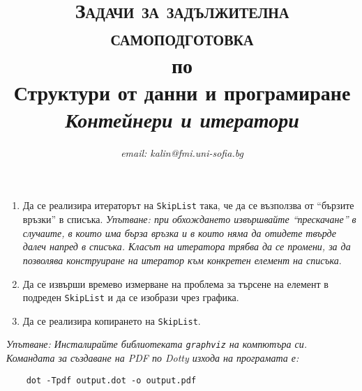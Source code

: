 \documentclass[12pt,a4paper]{article}
\author{\textit{email: kalin@fmi.uni-sofia.bg}}
\title{\textsc{Задачи за задължителна самоподготовка} \\
по \\
Структури от данни и програмиране\\
\textit{Контейнери и итератори}}
\newcommand{\code}[1]{\texttt{#1}}
\begin{document}
\maketitle


\begin{enumerate}

	\item  Да се реализира итераторът на \code{SkipList} така, че да се възползва от ``бързите връзки'' в списъка. \textit {Упътване: при обхождането извършвайте ``прескачане'' в случаите, в които има бърза връзка и в които няма да отидете твърде далеч напред в списъка. Класът на итератора трябва да се промени, за да позволява конструиране на итератор към конкретен елемент на списъка}.
	\item  Да се извърши времево измерване на проблема за търсене на елемент в подреден \code{SkipList} и да се изобрази чрез графика.
	\item Да се реализира копирането на \code{SkipList}.

\end{enumerate}


	\vspace{20px}

	\textit {Упътване: Инсталирайте библиотеката \code{graphviz} на компютъра си. Командата за създаване на PDF по Dotty изхода на програмата е:}

	\begin{verbatim}
	dot -Tpdf output.dot -o output.pdf
	\end{verbatim}
\end{document}
